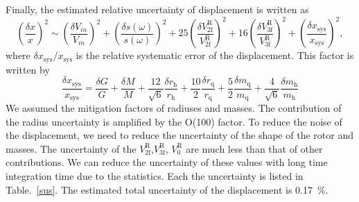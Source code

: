 \documentclass[%
 reprint,
superscriptaddress,
 amsmath,amssymb,
 aps,
]{revtex4-1}
\begin{document}
 Finally, the estimated relative uncertainty of  displacement is written as
 \footnotesize
\begin{equation}
\left( \frac{\delta x}{x} \right)^2 \!\sim \! \left( \!\frac{\delta V_{in}}{V_{in}}\! \right)^2+\left(\! \frac{\delta s(\omega)}{s(\omega)} \! \right)^2\!+\!25\!\left(\!\frac{\delta V^{\mathrm{R}}_{{\mathrm{2f}}}}{V^{\mathrm{R}}_{{\mathrm{2f}}}}\! \right)^2+16\!\left(\! \frac{\delta V^{\mathrm{R}}_{{\mathrm{3f}}}}{V^{\mathrm{R}}_{{\mathrm{3f}}}}\! \right)^2\!+ \left(\! \frac{\delta x_{\mathrm{sys}}}{x_{\mathrm{sys}}} \! \right)^2 \label{deltax},
\end{equation}
\normalsize
where $\delta x_{\mathrm{sys}}/x_{\mathrm{sys}}$ is the relative systematic error of the displacement. This factor is written by
 \footnotesize
\begin{equation}
\frac{\delta x_{\mathrm{sys}}}{x_{\mathrm{sys}}}=\frac{\delta G}{G} + \frac{\delta M}{M} +\frac{12}{\sqrt{6}} \frac{\delta r_{\mathrm{h}}}{r_{\mathrm{h}}} +\frac{10}{2} \frac{\delta r_{\mathrm{q}}}{r_{\mathrm{q}}}  +\frac{5}{2} \frac{\delta m_{\mathrm{q}}}{m_{\mathrm{q}}} +\!\frac{4}{\sqrt{6}}  \! \frac{\delta m_{\mathrm{h}}}{m_{\mathrm{h}}} 
\end{equation}
\normalsize
We assumed the mitigation factors of radiuses and masses.
The contribution of the radius uncertainty is amplified by the O(100) factor. To reduce the noise of the displacement, we need to reduce the uncertainty of the shape of the rotor and masses.
The uncertainty of the $V^{\mathrm{R}}_{\mathrm{2f}}$,$V^{\mathrm{R}}_{\mathrm{3f}}$, $V^{\mathrm{R}}_{0}$ are much less than that of other contributions. We can reduce the uncertainty of these values with long time integration time due to the statistics. Each the uncertainty is listed in Table.~\ref{sus}. The estimated  total uncertainty of the displacement is 0.17~\%.

\end{document}
